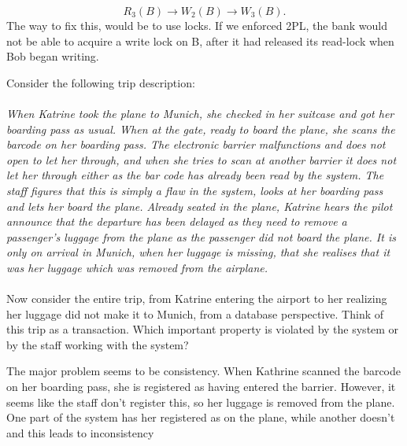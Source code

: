 \documentclass[working, oneside]{../../Preambles/tuftebook}
\begin{document}
\[
R_3\left( B \right) \to W_2\left( B \right) \to W_3\left( B \right) 
.\] 
The way to fix this, would be to use locks. If we enforced 2PL, the bank would not be able to acquire a write lock on B, after it had released its read-lock when Bob began writing.
\begin{exercise}[3]
Consider the following trip description: \\\\
\textit{When Katrine took the plane to Munich, she checked in her suitcase and
got her boarding pass as usual. When at the gate, ready to board the
plane, she scans the barcode on her boarding pass. The electronic barrier
malfunctions and does not open to let her through, and when she tries to
scan at another barrier it does not let her through either as the bar code
has already been read by the system. The staff figures that this is simply a
flaw in the system, looks at her boarding pass and lets her board the plane.
Already seated in the plane, Katrine hears the pilot announce that the
departure has been delayed as they need to remove a passenger’s luggage
from the plane as the passenger did not board the plane. It is only on
arrival in Munich, when her luggage is missing, that she realises that it was
her luggage which was removed from the airplane.}\\\\
Now consider the entire trip, from Katrine entering the airport to her realizing her
luggage did not make it to Munich, from a database perspective. Think of this trip as
a transaction. Which important property is violated by the system or by the staff
working with the system?
\end{exercise}
The major problem seems to be consistency. When Kathrine scanned the barcode on her boarding pass, she is registered as having entered the barrier. However, it seems like the staff don't register this, so her luggage is removed from the plane. One part of the system has her registered as on the plane, while another doesn't and this leads to inconsistency
\end{document}
